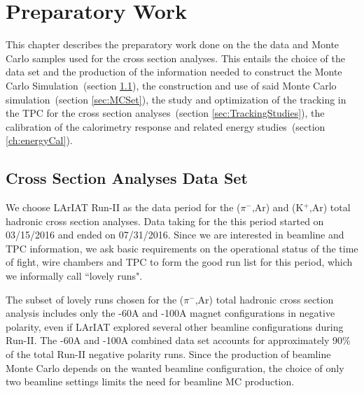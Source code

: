 \chapter{Preparatory Work}\label{ch:samples}



This chapter describes the preparatory work done on the the data and Monte Carlo samples used for the cross section analyses. 
This entails the choice of the data set and the production of the information needed to construct the Monte Carlo Simulation~(section \ref{sec:dataSet}),  the construction and use of said Monte Carlo simulation~(section \ref{sec:MCSet}), the study and optimization of the tracking in the TPC for the cross section analyses~(section \ref{sec:TrackingStudies}),  the calibration of the calorimetry response and related energy studies~(section \ref{ch:energyCal}). 



\section{Cross Section Analyses Data Set}\label{sec:dataSet}
We choose LArIAT Run-II as the data period for the  ($\pi^{-}$,Ar) and (K$^{+}$,Ar) total hadronic cross section analyses. 
Data taking for the this period started on 03/15/2016  and ended on 07/31/2016. 
Since we are interested in beamline and TPC information, we ask basic requirements on the operational status of the time of fight, wire chambers and TPC to form the good run list for this period, which we informally call ``lovely runs".

The subset of lovely runs  chosen for the  ($\pi^{-}$,Ar) total hadronic cross section analysis includes only the -60A and -100A magnet configurations in negative polarity, even if LArIAT explored several other beamline configurations during Run-II. The -60A and -100A combined data set accounts for approximately 90\% of the total Run-II negative polarity runs.   Since the production of beamline Monte Carlo depends on the wanted beamline configuration, the choice of only two beamline settings limits the need for beamline MC production. 

